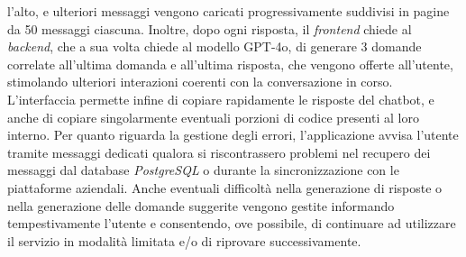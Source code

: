 l'alto, e ulteriori messaggi vengono caricati progressivamente suddivisi in pagine da 50 messaggi ciascuna. Inoltre, dopo ogni risposta, il 
\emph{frontend} chiede al \emph{backend}, che a sua volta chiede al modello GPT-4o, di generare 3 domande correlate all'ultima domanda e all'ultima risposta, che vengono offerte all'utente, stimolando ulteriori interazioni coerenti con la conversazione in corso. L'interfaccia permette infine di copiare rapidamente le 
risposte del chatbot, e anche di copiare singolarmente eventuali porzioni di codice presenti al loro interno.
Per quanto riguarda la gestione degli errori, l’applicazione avvisa l’utente tramite messaggi dedicati qualora si riscontrassero problemi nel recupero dei messaggi dal database
\emph{PostgreSQL} o durante la sincronizzazione con le piattaforme aziendali. Anche eventuali difficoltà nella generazione di 
risposte o nella generazione delle domande suggerite vengono gestite informando tempestivamente l’utente e consentendo, ove possibile, di continuare ad utilizzare il servizio 
in modalità limitata e/o di riprovare successivamente.





